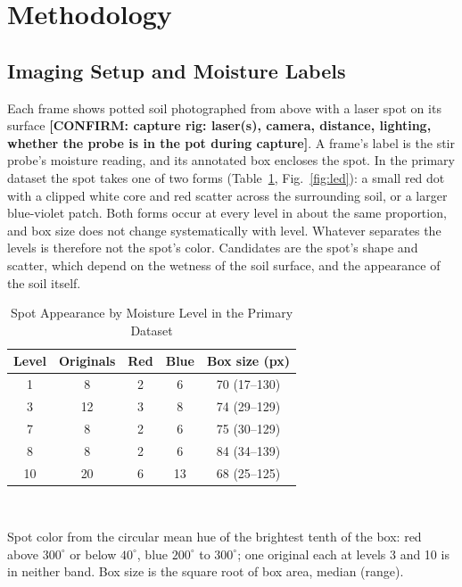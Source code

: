﻿\documentclass[journal]{IEEEtran}
\begin{document}
\section{Methodology}
\label{sec:method}

\subsection{Imaging Setup and Moisture Labels}
\label{sec:sensor}
Each frame shows potted soil photographed from above with a laser spot on its surface \textbf{[CONFIRM: capture rig: laser(s), camera, distance, lighting, whether the probe is in the pot during capture]}. A frame's label is the stir probe's moisture reading, and its annotated box encloses the spot. In the primary dataset the spot takes one of two forms (Table~\ref{tab:led}, Fig.~\ref{fig:led}): a small red dot with a clipped white core and red scatter across the surrounding soil, or a larger blue-violet patch. Both forms occur at every level in about the same proportion, and box size does not change systematically with level. Whatever separates the levels is therefore not the spot's color. Candidates are the spot's shape and scatter, which depend on the wetness of the soil surface, and the appearance of the soil itself.

\begin{table}[!t]
\renewcommand{\arraystretch}{1.3}
\caption{Spot Appearance by Moisture Level in the Primary Dataset}
\label{tab:led}
\centering
\begin{tabular}{c c c c c}
\toprule
\textbf{Level} & \textbf{Originals} & \textbf{Red} & \textbf{Blue} & \textbf{Box size (px)} \\
\midrule
1  & 8  & 2 & 6  & 70 (17--130) \\
3  & 12 & 3 & 8  & 74 (29--129) \\
7  & 8  & 2 & 6  & 75 (30--129) \\
8  & 8  & 2 & 6  & 84 (34--139) \\
10 & 20 & 6 & 13 & 68 (25--125) \\
\bottomrule
\end{tabular}
\\[2pt]
\parbox{\columnwidth}{\footnotesize Spot color from the circular mean hue of the brightest tenth of the box: red above $300^{\circ}$ or below $40^{\circ}$, blue $200^{\circ}$ to $300^{\circ}$; one original each at levels 3 and 10 is in neither band. Box size is the square root of box area, median (range).}
\end{table}
\end{document}
